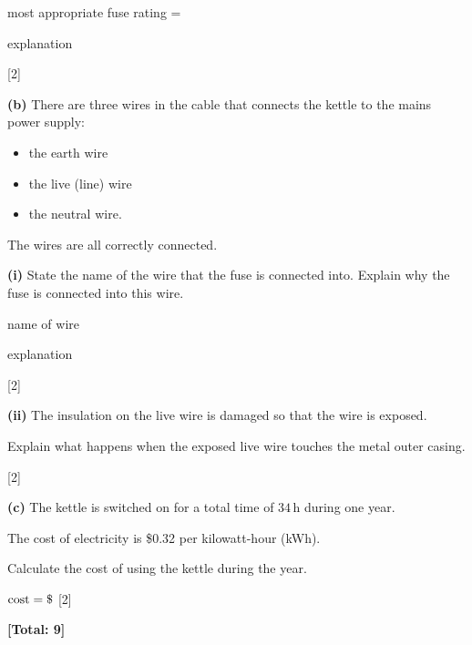 \documentclass[12pt,a4paper]{article}
\newcommand{\totalmarks}[1]{\par\nopagebreak\hfill\textbf{[Total: #1]}\par}
\newcommand{\wline}{\par\vspace{1.5pt}\noindent\dotfill\par\vspace{1.5pt}}
\begin{document}
\vspace{4pt}
\noindent most appropriate fuse rating = \dotfill\ 

\noindent explanation \dotfill \wline \wline
\hfill[2]

\newpage


\textbf{(b)} There are three wires in the cable that connects the kettle to the mains power supply:
\begin{itemize}[leftmargin=2.5em,itemsep=1pt]
  \item the earth wire
  \item the live (line) wire
  \item the neutral wire.
\end{itemize}

The wires are all correctly connected.

\hspace*{1.5em}\textbf{(i)} State the name of the wire that the fuse is connected into. Explain why the fuse is connected into this wire.

\vspace{4pt}
\noindent name of wire \dotfill

\noindent explanation \dotfill \wline \wline
\hfill[2]

\hspace*{1.5em}\textbf{(ii)} The insulation on the live wire is damaged so that the wire is exposed.

Explain what happens when the exposed live wire touches the metal outer casing.

\wline \wline \wline
\hfill[2]

\textbf{(c)} The kettle is switched on for a total time of $34\,\mathrm{h}$ during one year.

The cost of electricity is \$0.32 per kilowatt-hour (kWh).

Calculate the cost of using the kettle during the year.

\vspace{2.5cm}
\noindent $\mathrm{cost} = \$\dotfill$ \hfill[2]

\totalmarks{9}

\newpage

\end{document}

